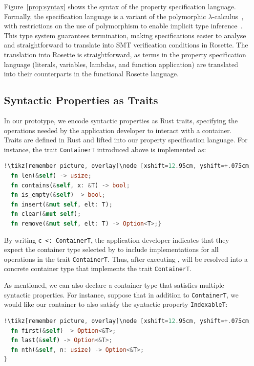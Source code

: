 Figure~\ref{prop:syntax} shows the syntax of the \Primrose{} property specification language. Formally, the specification language is a variant of the polymorphic $\lambda$-calculus~\citep{DBLP:conf/programm/Reynolds74, DBLP:journals/tcs/Girard86}, with 
restrictions on the use of polymorphism to enable implicit type inference~\citep{hindley1969principal, MILNER1978348}.
This type system guarantees termination, making specifications easier to analyse and straightforward to translate into SMT verification conditions in Rosette.
The translation into Rosette is straightforward, as terms in the \Primrose{} property specification language (literals, variables, lambdas, and function application) are translated into their counterparts in the functional Rosette language. 

\subsection{Syntactic Properties as Traits}
\label{chap2:prop:syntactic}
In our \Primrose{} prototype, we encode syntactic properties as Rust traits, specifying the operations needed by the application developer to interact with a container. 
Traits are defined in Rust and lifted into our property specification language. For instance, the trait \lstinline|ContainerT| introduced above is implemented as:
\begin{lstlisting}[language=Rust, style=boxed, escapechar=!]
!\tikz[remember picture, overlay]\node [xshift=12.95cm, yshift=+.075cm, inner sep=0.075cm, rectangle] {\footnotesize\bfseries\texttt{Rust}};!pub trait ContainerT<T> {
  fn len(&self) -> usize;
  fn contains(&self, x: &T) -> bool;
  fn is_empty(&self) -> bool;
  fn insert(&mut self, elt: T);
  fn clear(&mut self);
  fn remove(&mut self, elt: T) -> Option<T>;}
\end{lstlisting}

By writing \lstinline{c <: ContainerT}, the application developer indicates that they expect the container type selected by \Primrose{} to include implementations for all operations in the trait \lstinline{ContainerT}. 
Thus, after executing \Primrose{},  will be resolved into a concrete container type that implements the trait \lstinline{ContainerT}.

As mentioned, we can also declare a container type that satisfies multiple syntactic properties. For instance, suppose that in addition to \lstinline{ContainerT}, we would like our container to also satisfy the syntactic property \lstinline{IndexableT}:
\begin{lstlisting}[language=Rust, style=boxed, escapechar=!]
!\tikz[remember picture, overlay]\node [xshift=12.95cm, yshift=+.075cm, inner sep=0.075cm, rectangle] {\footnotesize\bfseries\texttt{Rust}};!pub trait IndexableT<T> {
  fn first(&self) -> Option<&T>;
  fn last(&self) -> Option<&T>;
  fn nth(&self, n: usize) -> Option<&T>;
}
\end{lstlisting}


